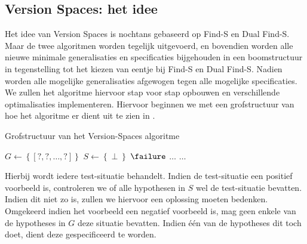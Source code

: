 \subsection{Version Spaces: het idee}
Het idee van Version Spaces is nochtans gebaseerd op Find-S en Dual Find-S. Maar de twee algoritmen worden tegelijk uitgevoerd, en bovendien worden alle nieuwe minimale generalisaties en specificaties bijgehouden in een boomstructuur in tegenstelling tot het kiezen van eentje bij Find-S en Dual Find-S. Nadien worden alle mogelijke generalisaties afgewogen tegen alle mogelijke specificaties. We zullen het algoritme hiervoor stap voor stap opbouwen en verschillende optimalisaties implementeren. Hiervoor beginnen we met een grofstructuur van hoe het algoritme er dient uit te zien in .
\begin{algorithm}[htb]                      %
\caption{Grofstructuur van het Version-Spaces algoritme}          %
\label{alg:versionSpacesBase}                           %
\begin{algorithmic}[1]                    %
\STATE{}
\STATE $G\leftarrow\left\{\left[\mbox{?},\mbox{?},\ldots,\mbox{?}\right]\right\}$
\STATE{}
\STATE $S\leftarrow\left\{\perp\right\}$
\STATE{}
\RETURN $\failure$
\ENDIF
{}
\STATE{}
\STATE{}
\STATE{}
\STATE $\ldots$
\ENDIF
\ENDFOR
\STATE{}
\ELSE
\STATE{}
\STATE{}
\STATE{}
\STATE $\ldots$
\ENDIF
\ENDFOR
\STATE{}
\ENDIF
\ENDFOR
\end{algorithmic}
\end{algorithm}
Hierbij wordt iedere test-situatie behandelt. Indien de test-situatie een positief voorbeeld is, controleren we of alle hypothesen in $S$ wel de test-situatie bevatten. Indien dit niet zo is, zullen we hiervoor een oplossing moeten bedenken. Omgekeerd indien het voorbeeld een negatief voorbeeld is, mag geen enkele van de hypotheses in $G$ deze situatie bevatten. Indien \'e\'en van de hypotheses dit toch doet, dient deze gespecificeerd te worden.

